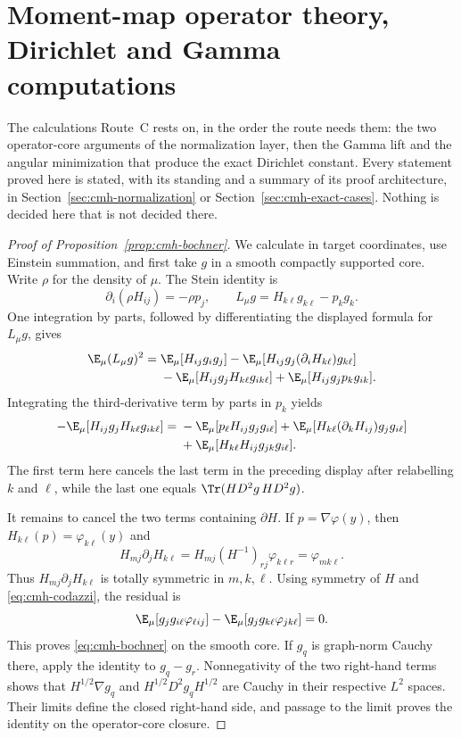 \documentclass[../../main.tex]{subfiles}
\begin{document}
\section{Moment-map operator theory, Dirichlet and Gamma computations}
\label{sec:appendix-moment-map}

The calculations Route~C rests on, in the order the route needs them: the two operator-core
arguments of the normalization layer, then the Gamma lift and the angular minimization that
produce the exact Dirichlet constant. Every statement proved here is stated, with its standing
and a summary of its proof architecture, in Section~\ref{sec:cmh-normalization} or
Section~\ref{sec:cmh-exact-cases}. Nothing is decided here that is not decided there.

\begin{proof}[Proof of Proposition~\ref{prop:cmh-bochner}]
We calculate in target coordinates, use Einstein summation, and first take $g$ in a smooth
compactly supported core.  Write $\rho$ for the density of $\mu$.  The Stein identity is
\[
  \partial_i(\rho H_{ij})=-\rho p_j,
  \qquad L_\mu g=H_{k\ell}g_{k\ell}-p_k g_k.
\]
One integration by parts, followed by differentiating the displayed formula for $L_\mu g$,
gives
\begin{align*}
  \E_\mu(L_\mu g)^2
  ={}&\E_\mu[H_{ij}g_i g_j]
     -\E_\mu[H_{ij}g_j(\partial_iH_{k\ell})g_{k\ell}]\\
    &-\E_\mu[H_{ij}g_jH_{k\ell}g_{ik\ell}]
     +\E_\mu[H_{ij}g_jp_k g_{ik}].
\end{align*}
Integrating the third-derivative term by parts in $p_k$ yields
\begin{align*}
 -\E_\mu[H_{ij}g_jH_{k\ell}g_{ik\ell}]
  ={}&-\E_\mu[p_\ell H_{ij}g_jg_{i\ell}]
      +\E_\mu[H_{k\ell}(\partial_kH_{ij})g_jg_{i\ell}]\\
     &+\E_\mu[H_{k\ell}H_{ij}g_{jk}g_{i\ell}].
\end{align*}
The first term here cancels the last term in the preceding display after relabelling
$k$ and $\ell$, while the last one equals $\Tr(HD^2g\,HD^2g)$.

It remains to cancel the two terms containing $\partial H$.  If $p=\nabla\varphi(y)$, then
$H_{k\ell}(p)=\varphi_{k\ell}(y)$ and
\begin{equation}
  H_{mj}\partial_jH_{k\ell}
  =H_{mj}(H^{-1})_{rj}\varphi_{k\ell r}
  =\varphi_{mk\ell}.
  \label{eq:cmh-codazzi}
\end{equation}
Thus $H_{mj}\partial_jH_{k\ell}$ is totally symmetric in $m,k,\ell$.  Using symmetry of
$H$ and \eqref{eq:cmh-codazzi}, the residual is
\[
  \E_\mu[g_jg_{i\ell}\varphi_{\ell ij}]
  -\E_\mu[g_jg_{k\ell}\varphi_{jk\ell}]=0.
\]
This proves \eqref{eq:cmh-bochner} on the smooth core.  If $g_q$ is graph-norm Cauchy there,
apply the identity to $g_q-g_r$.  Nonnegativity of the two right-hand terms shows that
$H^{1/2}\nabla g_q$ and $H^{1/2}D^2g_qH^{1/2}$ are Cauchy in their respective $L^2$ spaces.
Their limits define the closed right-hand side, and passage to the limit proves the identity on
the operator-core closure.
\end{proof}
\end{document}
